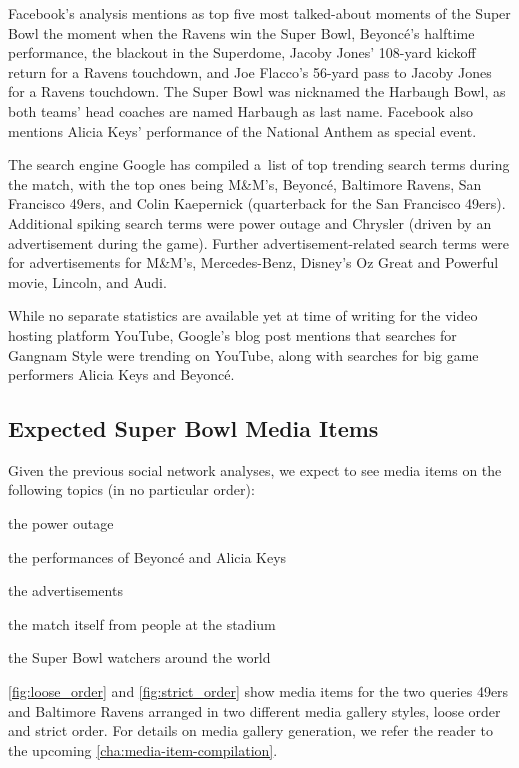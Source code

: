 Facebook's analysis mentions as top five most talked-about moments of the Super Bowl 
the moment when the Ravens win the Super Bowl, 
Beyoncé's halftime performance,
the blackout in the Superdome,
Jacoby Jones' 108-yard kickoff return for a Ravens touchdown, and
Joe Flacco’s 56-yard pass to Jacoby Jones for a Ravens touchdown.
The Super Bowl was nicknamed the Harbaugh Bowl, as both teams' head coaches
are named Harbaugh as last name.
Facebook also mentions Alicia Keys' performance of the National Anthem as special event.

The search engine Google has compiled a~list of top trending search terms
during the match, with the top ones being M\&M's, Beyoncé, Baltimore Ravens,
San Francisco 49ers, and Colin Kaepernick (quarterback for the San Francisco 49ers).
Additional spiking search terms were power outage
and Chrysler (driven by an advertisement during the game).
Further advertisement-related search terms were for advertisements for M\&M's,
Mercedes-Benz, Disney’s Oz Great and Powerful movie, Lincoln, and Audi.

While no separate statistics are available yet at time of writing
for the video hosting platform YouTube,
Google's blog post mentions that searches for Gangnam Style were trending on YouTube,
along with searches for big game performers Alicia Keys and Beyoncé.

\subsection{Expected Super Bowl Media Items}

Given the previous social network analyses, we expect to see media items
on the following topics (in no particular order):

\begin{small_itemize}
  \item[] the power outage
  \item[] the performances of Beyoncé and Alicia Keys
  \item[] the advertisements
  \item[] the match itself from people at the stadium
  \item[] the Super Bowl watchers around the world 
\end{small_itemize}

\autoref{fig:loose_order} and \autoref{fig:strict_order} show media items
for the two queries 49ers and Baltimore Ravens arranged
in two different media gallery styles, loose order and strict order.
For details on media gallery generation, we refer the reader to the upcoming
\autoref{cha:media-item-compilation}.

